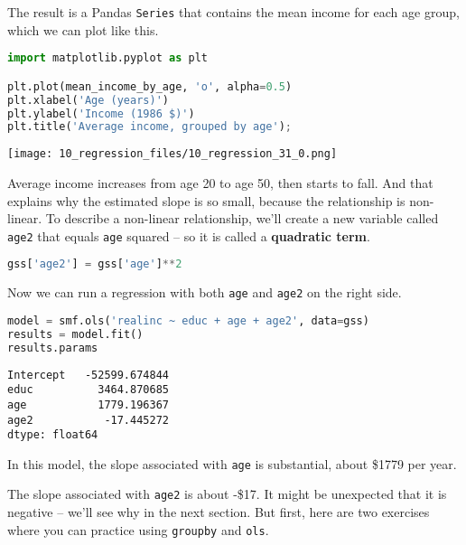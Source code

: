 The result is a Pandas \passthrough{\lstinline!Series!} that contains
the mean income for each age group, which we can plot like this.

\begin{lstlisting}[language=Python,style=source]
import matplotlib.pyplot as plt

plt.plot(mean_income_by_age, 'o', alpha=0.5)
plt.xlabel('Age (years)')
plt.ylabel('Income (1986 $)')
plt.title('Average income, grouped by age');
\end{lstlisting}

\begin{center}
\texttt{[image: 10\_regression\_files/10\_regression\_31\_0.png]}
\end{center}

Average income increases from age 20 to age 50, then starts to fall. And
that explains why the estimated slope is so small, because the
relationship is non-linear. To describe a non-linear relationship, we'll
create a new variable called \passthrough{\lstinline!age2!} that equals
\passthrough{\lstinline!age!} squared -- so it is called a
\textbf{quadratic term}.

\begin{lstlisting}[language=Python,style=source]
gss['age2'] = gss['age']**2
\end{lstlisting}

Now we can run a regression with both \passthrough{\lstinline!age!} and
\passthrough{\lstinline!age2!} on the right side.

\begin{lstlisting}[language=Python,style=source]
model = smf.ols('realinc ~ educ + age + age2', data=gss)
results = model.fit()
results.params
\end{lstlisting}

\begin{lstlisting}[style=output]
Intercept   -52599.674844
educ          3464.870685
age           1779.196367
age2           -17.445272
dtype: float64
\end{lstlisting}

In this model, the slope associated with \passthrough{\lstinline!age!}
is substantial, about \$1779 per year.

The slope associated with \passthrough{\lstinline!age2!} is about -\$17.
It might be unexpected that it is negative -- we'll see why in the next
section. But first, here are two exercises where you can practice using
\passthrough{\lstinline!groupby!} and \passthrough{\lstinline!ols!}.

